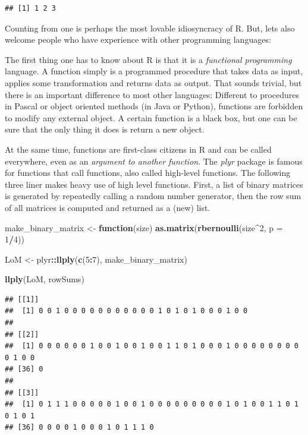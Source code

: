 \documentclass[]{svmono}
\newenvironment{Shaded}{\begin{snugshade}}{\end{snugshade}}
\newcommand{\KeywordTok}[1]{\textcolor[rgb]{0.13,0.29,0.53}{\textbf{#1}}}
\newcommand{\DataTypeTok}[1]{\textcolor[rgb]{0.13,0.29,0.53}{#1}}
\newcommand{\DecValTok}[1]{\textcolor[rgb]{0.00,0.00,0.81}{#1}}
\newcommand{\StringTok}[1]{\textcolor[rgb]{0.31,0.60,0.02}{#1}}
\newcommand{\ControlFlowTok}[1]{\textcolor[rgb]{0.13,0.29,0.53}{\textbf{#1}}}
\newcommand{\OperatorTok}[1]{\textcolor[rgb]{0.81,0.36,0.00}{\textbf{#1}}}
\newcommand{\NormalTok}[1]{#1}
\begin{document}
\begin{verbatim}
## [1] 1 2 3
\end{verbatim}

Counting from one is perhaps the most lovable idiosyncracy of R. But,
lets also welcome people who have experience with other programming
languages:

The first thing one has to know about R is that it is a \emph{functional
programming} language. A function simply is a programmed procedure that
takes data as input, applies some transformation and returns data as
output. That sounds trivial, but there is an important difference to
most other languages: Different to procedures in Pascal or object
oriented methods (in Java or Python), functions are forbidden to modify
any external object. A certain function is a black box, but one can be
sure that the only thing it does is return a new object.

At the same time, functions are first-class citizens in R and can be
called everywhere, even as an \emph{argument to another function}. The
\emph{plyr} package is famous for functions that call functions, also
called high-level functions. The following three liner makes heavy use
of high level functions. First, a list of binary matrices is generated
by repeatedly calling a random number generator, then the row sum of all
matrices is computed and returned as a (new) list.

\begin{Shaded}
\begin{Highlighting}[]
\NormalTok{make_binary_matrix <-}\StringTok{ }
\StringTok{  }\ControlFlowTok{function}\NormalTok{(size) }\KeywordTok{as.matrix}\NormalTok{(}\KeywordTok{rbernoulli}\NormalTok{(size}\OperatorTok{^}\DecValTok{2}\NormalTok{, }\DataTypeTok{p =} \DecValTok{1}\OperatorTok{/}\DecValTok{4}\NormalTok{))}

\NormalTok{LoM <-}\StringTok{ }\NormalTok{plyr}\OperatorTok{::}\KeywordTok{llply}\NormalTok{(}\KeywordTok{c}\NormalTok{(}\DecValTok{5}\OperatorTok{:}\DecValTok{7}\NormalTok{), make_binary_matrix)}

\KeywordTok{llply}\NormalTok{(LoM, rowSums)}
\end{Highlighting}
\end{Shaded}

\begin{verbatim}
## [[1]]
##  [1] 0 0 1 0 0 0 0 0 0 0 0 0 0 0 1 0 1 0 1 0 0 0 1 0 0
## 
## [[2]]
##  [1] 0 0 0 0 0 0 1 0 0 1 0 0 1 0 0 1 1 0 1 0 0 0 1 0 0 0 0 0 0 0 0 0 1 0 0
## [36] 0
## 
## [[3]]
##  [1] 0 1 1 1 0 0 0 0 0 1 0 0 1 0 0 0 0 0 0 0 0 0 1 0 1 0 0 1 1 0 1 0 1 0 1
## [36] 0 0 0 0 1 0 0 0 1 0 1 1 1 0
\end{verbatim}
\end{document}
